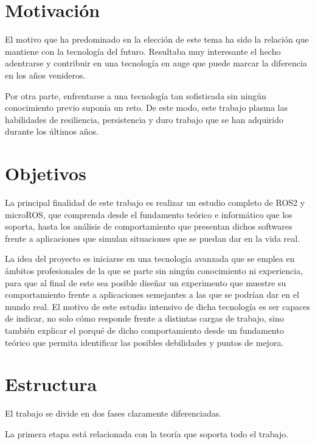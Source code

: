 \documentclass[a4paper,11pt,spanish]{sphinxmanual}
\begin{document}
\section{Motivación}
\label{\detokenize{introduccion:motivacion}}
\sphinxAtStartPar
El motivo que ha predominado en la elección de este tema ha sido la
relación que mantiene con la tecnología del futuro. Resultaba muy interesante
el hecho adentrarse y contribuir en una tecnología en auge que puede marcar la diferencia
en los años venideros.

\sphinxAtStartPar
Por otra parte, enfrentarse a una tecnología tan sofisticada sin ningún conocimiento
previo suponía un reto. De este modo, este trabajo plasma las habilidades de resiliencia,
persistencia y duro trabajo que se han adquirido durante los últimos años.


\section{Objetivos}
\label{\detokenize{introduccion:objetivos}}
\sphinxAtStartPar
La principal finalidad de este trabajo es realizar un estudio completo
de ROS2 y micro\sphinxhyphen{}ROS, que comprenda desde el fundamento teórico e informático
que los soporta, hasta los análisis de comportamiento que presentan dichos
softwares frente a aplicaciones que simulan situaciones que se puedan dar en la vida real.

\sphinxAtStartPar
La idea del proyecto es iniciarse en una tecnología avanzada que se emplea
en ámbitos profesionales de la que se parte sin ningún conocimiento ni experiencia,
para que al final de este sea posible diseñar un experimento que muestre su comportamiento
frente a aplicaciones semejantes a las que se podrían dar en el mundo real. El motivo
de este estudio intensivo de dicha tecnología es ser capaces de indicar, no solo cómo
responde frente a distintas cargas de trabajo, sino también explicar el porqué de
dicho comportamiento desde un fundamento teórico que permita identificar
las posibles debilidades y puntos de mejora.


\section{Estructura}
\label{\detokenize{introduccion:estructura}}
\sphinxAtStartPar
El trabajo se divide en dos fases claramente diferenciadas.

\sphinxAtStartPar
La primera etapa está relacionada con la teoría que soporta todo el trabajo.
\end{document}
